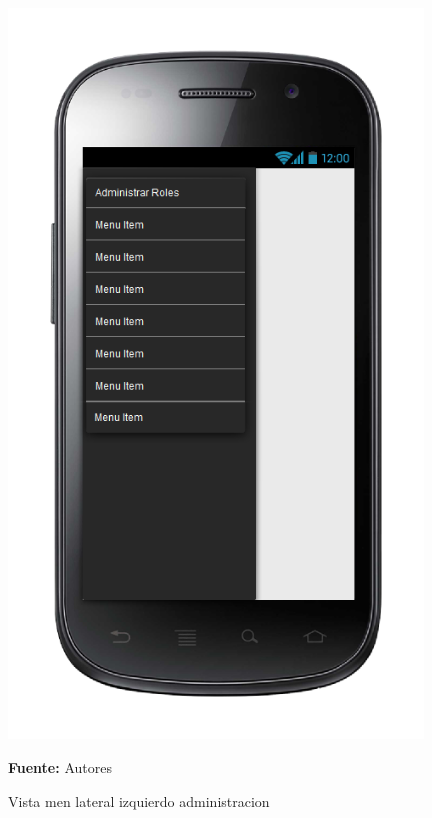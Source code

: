 \begin{figure}[!htb]
  \begin{center}
\includegraphics[width=11cm]{./imagenes/UI/Administracion/menu_lateral_izquierdo_administracion.png}
    \caption{Vista men lateral izquierdo administracion}
    \label{fig:Vista_menu_lateral_izquierdo_administracion}
    \textbf{Fuente:}  Autores
  \end{center}
\end{figure}
